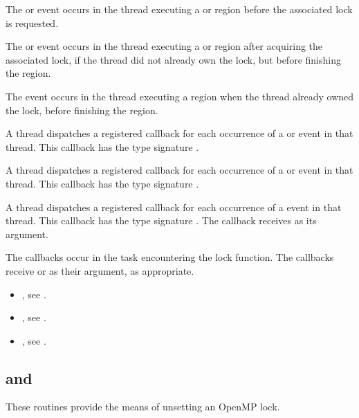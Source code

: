 \events

The  or  event occurs in the thread
executing a  or  region
before the associated lock is requested.

The  or  event occurs in the thread
executing a  or  region
after acquiring the associated lock, if the thread did not already own the lock,
but before finishing the region.

The  event occurs in the thread
executing a  region
when the thread already owned the lock,
before finishing the region.


\tools

A thread dispatches a registered 
callback for each occurrence of a  or  event
in that thread.  This callback has the type signature .

A thread dispatches a registered 
callback for each occurrence of a  or  event
in that thread.  This callback has the type signature .

A thread dispatches a registered 
callback for each occurrence of a  event
in that thread. This callback has the type signature .
The callback receives  as its  argument.

The callbacks occur in the task encountering
the lock function.  The callbacks receive  or
  as their  argument, as appropriate.


\crossreferences
\begin{itemize}
\item {}, see
.
\item {}, see
.
\item {}, see
.
\end{itemize}




\subsection{ and }
\label{subsec:omp_unset_lock and omp_unset_nest_lock}
\summary
These routines provide the means of unsetting an OpenMP lock.

